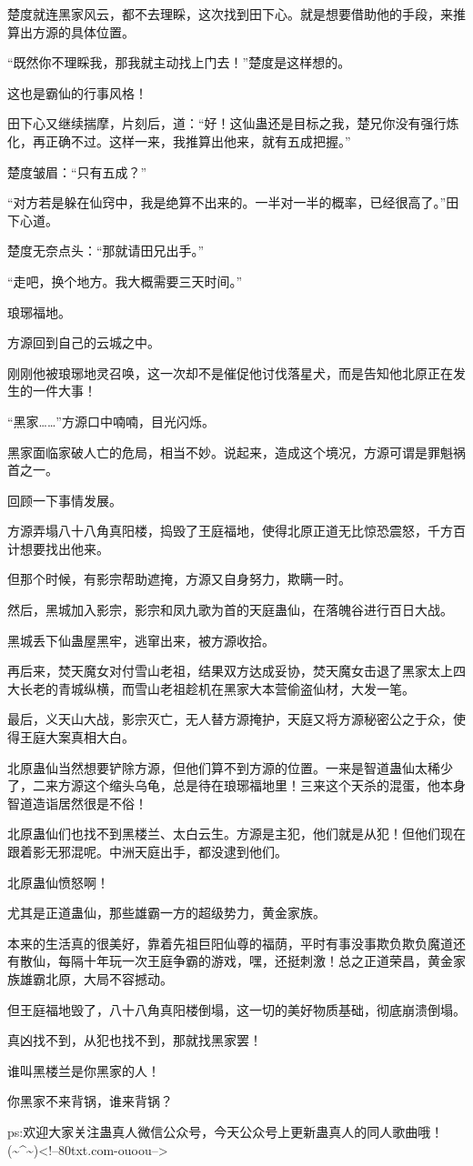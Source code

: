 \begin{this_body}
楚度就连黑家风云，都不去理睬，这次找到田下心。就是想要借助他的手段，来推算出方源的具体位置。

“既然你不理睬我，那我就主动找上门去！”楚度是这样想的。

这也是霸仙的行事风格！

田下心又继续揣摩，片刻后，道：“好！这仙蛊还是目标之我，楚兄你没有强行炼化，再正确不过。这样一来，我推算出他来，就有五成把握。”

楚度皱眉：“只有五成？”

“对方若是躲在仙窍中，我是绝算不出来的。一半对一半的概率，已经很高了。”田下心道。

楚度无奈点头：“那就请田兄出手。”

“走吧，换个地方。我大概需要三天时间。”

琅琊福地。

方源回到自己的云城之中。

刚刚他被琅琊地灵召唤，这一次却不是催促他讨伐落星犬，而是告知他北原正在发生的一件大事！

“黑家……”方源口中喃喃，目光闪烁。

黑家面临家破人亡的危局，相当不妙。说起来，造成这个境况，方源可谓是罪魁祸首之一。

回顾一下事情发展。

方源弄塌八十八角真阳楼，捣毁了王庭福地，使得北原正道无比惊恐震怒，千方百计想要找出他来。

但那个时候，有影宗帮助遮掩，方源又自身努力，欺瞒一时。

然后，黑城加入影宗，影宗和凤九歌为首的天庭蛊仙，在落魄谷进行百日大战。

黑城丢下仙蛊屋黑牢，逃窜出来，被方源收拾。

再后来，焚天魔女对付雪山老祖，结果双方达成妥协，焚天魔女击退了黑家太上四大长老的青城纵横，而雪山老祖趁机在黑家大本营偷盗仙材，大发一笔。

最后，义天山大战，影宗灭亡，无人替方源掩护，天庭又将方源秘密公之于众，使得王庭大案真相大白。

北原蛊仙当然想要铲除方源，但他们算不到方源的位置。一来是智道蛊仙太稀少了，二来方源这个缩头乌龟，总是待在琅琊福地里！三来这个天杀的混蛋，他本身智道造诣居然很是不俗！

北原蛊仙们也找不到黑楼兰、太白云生。方源是主犯，他们就是从犯！但他们现在跟着影无邪混呢。中洲天庭出手，都没逮到他们。

北原蛊仙愤怒啊！

尤其是正道蛊仙，那些雄霸一方的超级势力，黄金家族。

本来的生活真的很美好，靠着先祖巨阳仙尊的福荫，平时有事没事欺负欺负魔道还有散仙，每隔十年玩一次王庭争霸的游戏，嘿，还挺刺激！总之正道荣昌，黄金家族雄霸北原，大局不容撼动。

但王庭福地毁了，八十八角真阳楼倒塌，这一切的美好物质基础，彻底崩溃倒塌。

真凶找不到，从犯也找不到，那就找黑家罢！

谁叫黑楼兰是你黑家的人！

你黑家不来背锅，谁来背锅？

ps:欢迎大家关注蛊真人微信公众号，今天公众号上更新蛊真人的同人歌曲哦！(\~{}\^{}\~{})<!--80txt.com-ouoou-->

\end{this_body}

